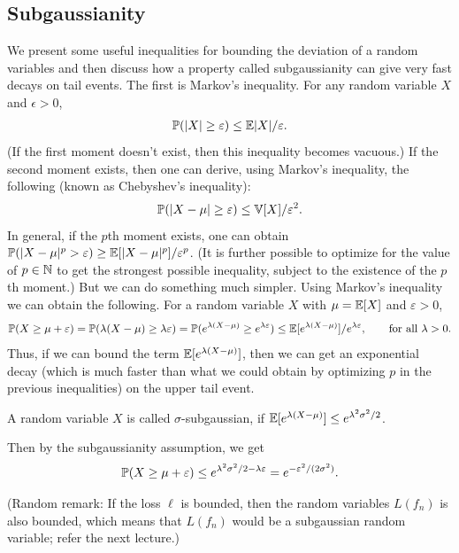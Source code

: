 \documentclass[twoside]{article}
\begin{document}
\subsection*{Subgaussianity}
We present some useful inequalities for bounding the deviation of a random variables and then discuss how a property called subgaussianity can give very fast decays on tail events. The first is Markov's inequality. For any random variable $X$ and $\epsilon > 0$,
\begin{align*}
  \mathbb{P}(|X| \geq \varepsilon) \leq \mathbb{E} |X| / \varepsilon. 
\end{align*}
(If the first moment doesn't exist, then this inequality becomes vacuous.) If the second moment exists, then one can derive, using Markov's inequality, the following (known as Chebyshev's inequality):
\begin{align*}
  \mathbb{P}(|X - \mu| \geq \varepsilon) \leq \mathbb{V}[X] / \varepsilon^2.
\end{align*}
In general, if the $p$th moment exists, one can obtain $\mathbb{P}(|X - \mu|^p > \varepsilon) \geq \mathbb{E}[|X - \mu|^p] / \varepsilon^p$. (It is further possible to optimize for the value of $p \in \mathbb{N}$ to get the strongest possible inequality, subject to the existence of the $p$th moment.) But we can do something much simpler. Using Markov's inequality we can obtain the following. For a random variable $X$ with $\mu = \mathbb{E}[X]$ and $\varepsilon > 0$, 
\begin{align*}
  \mathbb{P}(X \geq \mu + \varepsilon) = \mathbb{P}(\lambda (X - \mu) \geq \lambda \varepsilon) = \mathbb{P}( e^{\lambda (X - \mu)} \geq e^{\lambda \varepsilon}) \leq \mathbb{E}[e^{\lambda (X - \mu)}] / e^{\lambda \varepsilon}, \qquad \text{for all } \lambda > 0.
\end{align*}
Thus, if we can bound the term $\mathbb{E}[e^{\lambda (X - \mu)}]$, then we can get an exponential decay (which is much faster than what we could obtain by optimizing $p$ in the previous inequalities) on the upper tail event.

\begin{definition}[Subgaussianity]
  A random variable $X$ is called $\sigma$-subgaussian, if $\mathbb{E}[e^{\lambda (X - \mu)}] \leq e^{\lambda^2 \sigma^2 / 2}$.
\end{definition}
Then by the subgaussianity assumption, we get
\begin{align*}
  \mathbb{P}(X \geq \mu + \varepsilon) \leq e^{\lambda^2 \sigma^2 / 2 - \lambda \varepsilon} = e^{-\varepsilon^2 / (2 \sigma^2)}.
\end{align*}

(Random remark: If the loss $\ell$ is bounded, then the random variables $L(f_n)$ is also bounded, which means that $L(f_n)$ would be a subgaussian random variable; refer the next lecture.)



\end{document}
